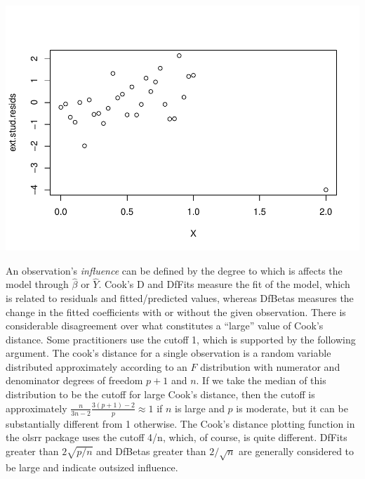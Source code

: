 \documentclass[
]{book}
\newenvironment{Shaded}{\begin{snugshade}}{\end{snugshade}}
\newcommand{\ConstantTok}[1]{\textcolor[rgb]{0.00,0.00,0.00}{#1}}
\newcommand{\ControlFlowTok}[1]{\textcolor[rgb]{0.13,0.29,0.53}{\textbf{#1}}}
\newcommand{\DecValTok}[1]{\textcolor[rgb]{0.00,0.00,0.81}{#1}}
\newcommand{\FunctionTok}[1]{\textcolor[rgb]{0.00,0.00,0.00}{#1}}
\newcommand{\NormalTok}[1]{#1}
\newcommand{\OtherTok}[1]{\textcolor[rgb]{0.56,0.35,0.01}{#1}}
\newcommand{\SpecialCharTok}[1]{\textcolor[rgb]{0.00,0.00,0.00}{#1}}
\begin{document}
\begin{Shaded}
\end{Shaded}

\includegraphics{13-MultipleLinearRegression_files/figure-latex/unnamed-chunk-18-3.pdf}

An observation's \emph{influence} can be defined by the degree to which is affects the model through \(\hat\beta\) or \(\hat Y\). Cook's D and DfFits measure the fit of the model, which is related to residuals and fitted/predicted values, whereas DfBetas measures the change in the fitted coefficients with or without the given observation. There is considerable disagreement over what constitutes a ``large'' value of Cook's distance. Some practitioners use the cutoff 1, which is supported by the following argument. The cook's distance for a single observation is a random variable distributed approximately according to an \(F\) distribution with numerator and denominator degrees of freedom \(p+1\) and \(n\). If we take the median of this distribution to be the cutoff for large Cook's distance, then the cutoff is approximately \(\frac{n}{3n-2}\frac{3(p+1)-2}{p}\approx 1\) if \(n\) is large and \(p\) is moderate, but it can be substantially different from 1 otherwise. The Cook's distance plotting function in the olsrr package uses the cutoff 4/n, which, of course, is quite different. DfFits greater than \(2\sqrt{p/n}\) and DfBetas greater than \(2/\sqrt{n}\) are generally considered to be large and indicate outsized influence.
\end{document}
